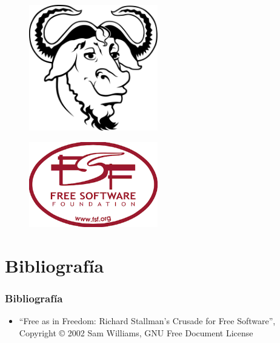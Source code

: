 \documentclass[xetex, mathserif, serif]{beamer}
\begin{document}
\begin{frame}
    \begin{figure}
        \includegraphics[width=0.5\textwidth]{imgs/Heckert_GNU_white}
    \end{figure}
\end{frame}


\begin{frame}
    \begin{figure}
        \includegraphics[width=0.5\textwidth]{imgs/free-software-foundation}
    \end{figure}
\end{frame}


\section{Bibliografía}
\begin{frame}[t]
    \frametitle{Bibliografía}
    \begin{itemize}
        \item ``Free as in Freedom: Richard Stallman's Crusade for Free Software'', Copyright \copyright{} 2002 Sam Williams, GNU Free Document License
    \end{itemize}
\end{frame}
\end{document}
